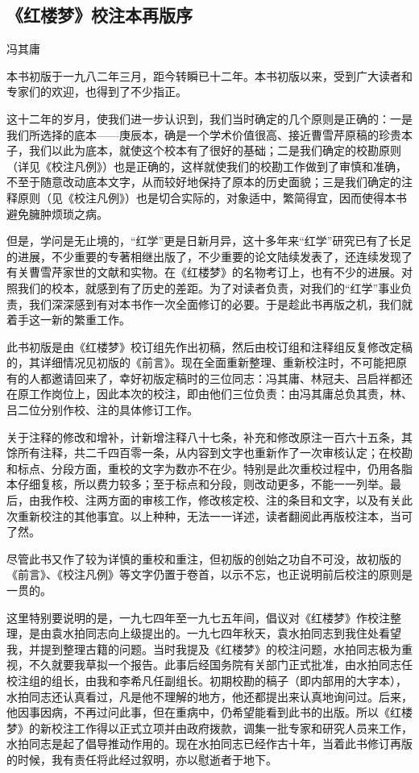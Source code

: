 \clearpage
\subsection*{《红楼梦》校注本再版序}
\begin{center}
    \par 冯其庸
\end{center}
\par 本书初版于一九八二年三月，距今转瞬已十二年。本书初版以来，受到广大读者和专家们的欢迎，也得到了不少指正。
\par 这十二年的岁月，使我们进一步认识到，我们当时确定的几个原则是正确的：一是我们所选择的底本——庚辰本，确是一个学术价值很高、接近曹雪芹原稿的珍贵本子，我们以此为底本，就使这个校本有了很好的基础；二是我们确定的校勘原则（详见《校注凡例》）也是正确的，这样就使我们的校勘工作做到了审慎和准确，不至于随意改动底本文字，从而较好地保持了原本的历史面貌；三是我们确定的注释原则（见《校注凡例》）也是切合实际的，对象适中，繁简得宜，因而使得本书避免臃肿烦琐之病。
\par 但是，学问是无止境的，“红学”更是日新月异，这十多年来“红学”研究已有了长足的进展，不少重要的专著相继出版了，不少重要的论文陆续发表了，还连续发现了有关曹雪芹家世的文献和实物。在《红楼梦》的名物考订上，也有不少的进展。对照我们的校本，就感到有了历史的差距。为了对读者负责，对我们的“红学”事业负责，我们深深感到有对本书作一次全面修订的必要。于是趁此书再版之机，我们就着手这一新的繁重工作。
\par 此书初版是由《红楼梦》校订组先作出初稿，然后由校订组和注释组反复修改定稿的，其详细情况见初版的《前言》。现在全面重新整理、重新校注时，不可能把原有的人都邀请回来了，幸好初版定稿时的三位同志：冯其庸、林冠夫、吕启祥都还在原工作岗位上，因此本次的校注，即由他们三位负责：由冯其庸总负其责，林、吕二位分别作校、注的具体修订工作。
\par 关于注释的修改和增补，计新增注释八十七条，补充和修改原注一百六十五条，其馀所有注释，共二千四百零一条，从内容到文字也重新作了一次审核认定；在校勘和标点、分段方面，重校的文字为数亦不在少。特别是此次重校过程中，仍用各脂本仔细复核，所以费力较多；至于标点和分段，则改动更多，不能一一列举。最后，由我作校、注两方面的审核工作，修改核定校、注的条目和文字，以及有关此次重新校注的其他事宜。以上种种，无法一一详述，读者翻阅此再版校注本，当可了然。
\par 尽管此书又作了较为详慎的重校和重注，但初版的创始之功自不可没，故初版的《前言》、《校注凡例》等文字仍置于卷首，以示不忘，也正说明前后校注的原则是一贯的。
\par 这里特别要说明的是，一九七四年至一九七五年间，倡议对《红楼梦》作校注整理，是由袁水拍同志向上级提出的。一九七四年秋天，袁水拍同志到我住处看望我，并提到整理古籍的问题。当时我提及《红楼梦》的校注问题，水拍同志极为重视，不久就要我草拟一个报告。此事后经国务院有关部门正式批准，由水拍同志任校注组的组长，由我和李希凡任副组长。初期校勘的稿子（即内部用的大字本），水拍同志还认真看过，凡是他不理解的地方，他还都提出来认真地询问过。后来，他因事因病，不再过问此事，但在重病中，仍希望能看到此书的出版。所以《红楼梦》的新校注工作得以正式立项并由政府拨款，调集一批专家和研究人员来工作，水拍同志是起了倡导推动作用的。现在水拍同志已经作古十年，当着此书修订再版的时候，我有责任将此经过叙明，亦以慰逝者于地下。
